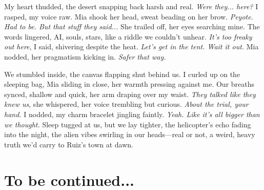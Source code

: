 \documentclass[12pt,oneside]{book} %
\begin{document}
My heart thudded, the desert snapping back harsh and real. \textit{Were they... here?} I rasped, my voice raw. Mia shook her head, sweat beading on her brow. \textit{Peyote. Had to be. But that stuff they said...} She trailed off, her eyes searching mine. The words lingered, AI, souls, stars, like a riddle we couldn’t unhear. \textit{It’s too freaky out here}, I said, shivering despite the heat. \textit{Let’s get in the tent. Wait it out.} Mia nodded, her pragmatism kicking in. \textit{Safer that way.}

We stumbled inside, the canvas flapping shut behind us. I curled up on the sleeping bag, Mia sliding in close, her warmth pressing against me. Our breaths synced, shallow and quick, her arm draping over my waist. \textit{They talked like they knew us}, she whispered, her voice trembling but curious. \textit{About the trial, your hand.} I nodded, my charm bracelet jingling faintly. \textit{Yeah. Like it’s all bigger than we thought.} Sleep tugged at us, but we lay tighter, the helicopter’s echo fading into the night, the alien vibes swirling in our heads—real or not, a weird, heavy truth we’d carry to Ruiz’s town at dawn.

\section{To be continued...}
\end{document}

